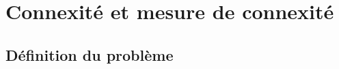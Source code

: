 \documentclass{article}      %
\begin{document}
\section{Connexité et mesure de connexité}
\subsection{Définition du problème}
\end{document}
